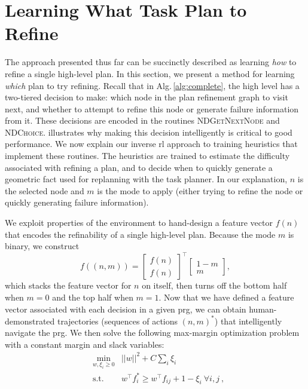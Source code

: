 \section{Learning What Task Plan to Refine}
The approach presented thus far can be succinctly described as learning \emph{how} to
refine a single high-level plan. In this section, we present a method for learning
\emph{which} plan to try refining. Recall that in Alg.\,\ref{alg:complete}, the high
level has a two-tiered decision to make: which node in the plan refinement graph to
visit next, and whether to attempt to refine this node or generate failure information
from it. These decisions are encoded in the routines \textsc{NDGetNextNode}
and \textsc{NDChoice}.  illustrates why making this decision intelligently is critical
to good performance. We now explain our inverse {\sc rl}
approach to training heuristics that implement these routines. The heuristics are trained to estimate
the difficulty associated with refining a plan, and to decide when to quickly generate
a geometric fact used for replanning with the task planner. In our explanation, $n$ is the selected
node and $m$ is the mode to apply (either trying to refine the node or quickly generating failure information).

We exploit properties of the environment to hand-design a feature vector $f(n)$ that encodes the refinability
of a single high-level plan. Because the mode $m$ is binary,
we construct $$f((n, m)) = \begin{bmatrix} f(n) \\ f(n) \end{bmatrix}^\top \begin{bmatrix} 1 - m \\ m \end{bmatrix},$$
which stacks the feature vector for $n$ on itself, then turns off the bottom half when $m = 0$ and the
top half when $m = 1$. Now that we have defined a feature vector associated with each decision in a given {\sc prg},
we can obtain human-demonstrated trajectories (sequences of actions $(n, m)^{*}$) that intelligently
navigate the {\sc prg}. We then solve the following max-margin optimization problem with a constant margin and slack variables:
\begin{align*}
&\min_{w, \xi_i \geq 0} & ||w||^2 + C \sum_i \xi_i\\
&\text{s.t.} & w^{\top}f^*_i \geq w^{\top}f_{ij} + 1 - \xi_{i}\ \forall i, j \ ,
\end{align*}

